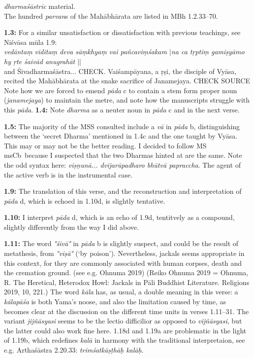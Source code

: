 \documentclass{article}
\newcommand{\vsnum}[1]{\textbf{#1}}
\newcommand{\skt}[1]{\textit{#1}}
\newcommand{\msCb}{msCb}
\begin{document}
\skt{dharmaśāstric} material. \\ The hundred \skt{parvan}s of the Mahābhārata are listed in MBh 1.2.33--70.

\vsnum{1.3: }For a similar unsatisfaction or dissatisfaction with previous teachings, see Niśvāsa mūla 1.9: \\ \textit{vedāntaṃ viditaṃ deva sāṃkhyaṃ vai pañcaviṃśakam $|$na ca tṛptiṃ gamiṣyāmo hy ṛte śaivād anugrahāt $||$} \\ and Śivadharmaśāstra... CHECK. Vaiśampāyana, a ṛṣi, the disciple of Vyāsa, recited the Mahābhārata at the snake sacrifice of Janamejaya. CHECK SOURCE \\ Note how we are forced to emend \skt{pāda} c to contain a stem form proper noun (\skt{janamejaya}) to maintain the metre, and note how the manuscripts struggle with this \skt{pāda}.  \vsnum{1.4: }Note \skt{dharma} as a neuter noun in \skt{pāda} c and in the next verse.

\vsnum{1.5: }The majority of the MSS consulted include a \skt{vā} in \skt{pāda} b, distinguishing between the `secret Dharma' mentioned in 1.4c and the one taught by Vyāsa. This may or may not be the better reading. I decided to follow MS \msCb\ because I suspected that the two Dharmas hinted at are the same. Note the odd syntax here: \skt{viṣṇunā... dvijarūpadharo bhūtvā papraccha}. The agent of the active verb is in the instrumental case.

\vsnum{1.9: }The translation of this verse, and the reconstruction and interpretation of \skt{pāda} d, which is echoed in 1.10d, is slightly tentative.

\vsnum{1.10: }I interpret \skt{pāda} d, which is an echo of 1.9d, tentitvely as a compound, slightly differently from the way I did above.

\vsnum{1.11: }The word \skt{°śivā°} in \skt{pāda} b is slightly suspect, and could be the result of metathesis, from \skt{°viṣā°} (`by poison'). Nevertheless, jackals seems appropriate in this context, for they are commonly associated with human corpses, death and the cremation ground. (see e.g. Ohnuma 2019) (Reiko Ohnuma 2019 = Ohnuma, R. The Heretical, Heterodox Howl: Jackals in Pāli Buddhist Literature. Religions 2019, 10, 221.) The word \skt{kāla} has, as usual, a double meaning in this verse: a \skt{kālapāśa} is both Yama's noose, and also the limitation caused by time, as becomes clear at the discussion on the different time units in verses 1.11--31. The variant \skt{jijñāsyasi} seems to be the lectio difficilior as opposed to \skt{vijñāsyasi}, but the latter could also work fine here. 1.18d and 1.19a are problematic in the light of 1.19b, which redefines \skt{kalā} in harmony with the traditional interpretaion, see e.g. Arthaśāstra 2.20.33: \skt{trimśatkāṣṭhāḥ kalāḥ}.
\end{document}
